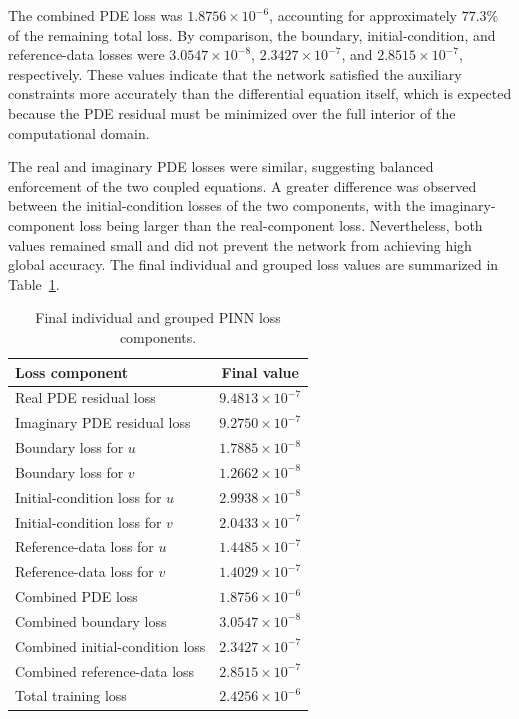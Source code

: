 \documentclass[11pt]{article}
\begin{document}
The combined PDE loss was \(1.8756\times10^{-6}\), accounting for approximately \(77.3\%\) of the 
remaining total loss. By comparison, the boundary, initial-condition, and reference-data 
losses were \(3.0547\times10^{-8}\), \(2.3427\times10^{-7}\), and \(2.8515\times10^{-7}\), 
respectively. These values indicate that the network satisfied the auxiliary constraints more 
accurately than the differential equation itself, which is expected because the PDE residual 
must be minimized over the full interior of the computational domain.

The real and imaginary PDE losses were similar, suggesting balanced enforcement of the two 
coupled equations. A greater difference was observed between the initial-condition losses 
of the two components, with the imaginary-component loss being larger than the 
real-component loss. Nevertheless, both values remained small and did not prevent the 
network from achieving high global accuracy. The final individual and grouped loss values 
are summarized in Table~\ref{tab:loss_components}.

\begin{table}[htbp]
\centering
\caption{Final individual and grouped PINN loss components.}
\label{tab:loss_components}
\begin{tabular}{lc}
\hline
\textbf{Loss component} & \textbf{Final value} \\
\hline
Real PDE residual loss
& \(9.4813\times10^{-7}\) \\

Imaginary PDE residual loss
& \(9.2750\times10^{-7}\) \\

Boundary loss for \(u\)
& \(1.7885\times10^{-8}\) \\

Boundary loss for \(v\)
& \(1.2662\times10^{-8}\) \\

Initial-condition loss for \(u\)
& \(2.9938\times10^{-8}\) \\

Initial-condition loss for \(v\)
& \(2.0433\times10^{-7}\) \\

Reference-data loss for \(u\)
& \(1.4485\times10^{-7}\) \\

Reference-data loss for \(v\)
& \(1.4029\times10^{-7}\) \\
\hline
Combined PDE loss
& \(1.8756\times10^{-6}\) \\

Combined boundary loss
& \(3.0547\times10^{-8}\) \\

Combined initial-condition loss
& \(2.3427\times10^{-7}\) \\

Combined reference-data loss
& \(2.8515\times10^{-7}\) \\

Total training loss
& \(2.4256\times10^{-6}\) \\
\hline
\end{tabular}

\end{table}
\end{document}
